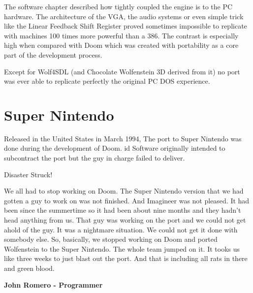 \documentclass[book.tex]{subfiles}
\begin{document}
The software chapter described how tightly coupled the engine is to the PC hardware. The architecture of the VGA,  the audio systems or even simple trick like the Linear Feedback Shift Register proved sometimes impossible to replicate with machines 100 times more powerful than a 386. The contrast is especially high when compared with Doom which was created with portability as a core part of the development process.\\
\par
Except for Wolf4SDL (and Chocolate Wolfenstein 3D derived from it) no port was ever able to replicate perfectly the original PC DOS experience. 


\section{Super Nintendo}
Released in the United States in March 1994, The port to Super Nintendo was done during the development of Doom. id Software originally intended to subcontract the port but the guy in charge failed to deliver.\\
\par
 \begin{fancyquotes}
Disaster Struck!\\
\par
We all had to stop working on Doom. The Super Nintendo version that we had gotten a guy to work on was not finished. And Imagineer was not pleased. It had been since the summertime so it had been about nine months and they hadn't head anything from us. That guy was working on the port and we could not get ahold of the guy. It was a nightmare situation. We could not get it done with somebody else. So, basically, we stopped working on Doom and ported Wolfenstein to the Super Nintendo. The whole team jumped on it. It tooks us like three weeks to just blast out the port. And that is including all rats in there and green blood.\\
\par
\textbf{John Romero - Programmer}
\end{fancyquotes}

\par
\begin{figure}[H]
\centering
 \end{figure}
 \par
\end{document}

